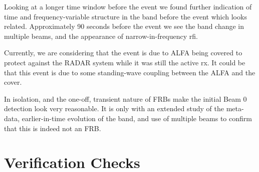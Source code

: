 \documentclass[a4paper,fleqn,usenatbib]{mnras}
\begin{document}

Looking at a longer time window before the event we found further indication of
time and frequency-variable structure in the band before the event which looks
related. Approximately 90 seconds before the event we see the band change in
multiple beams, and the appearance of narrow-in-frequency \gls{rfi}.

Currently, we are considering that the event is due to ALFA being covered to
protect against the RADAR system while it was still the active rx. It could be
that this event is due to some standing-wave coupling between the ALFA and the
cover.


In isolation, and the one-off, transient nature of FRBs make the initial Beam 0
detection look very reasonable. It is only with an extended study of the
meta-data, earlier-in-time evolution of the band, and use of multiple beams to
confirm that this is indeed not an FRB.

\section{Verification Checks}








 

\bsp	%
\label{lastpage}
\end{document}
